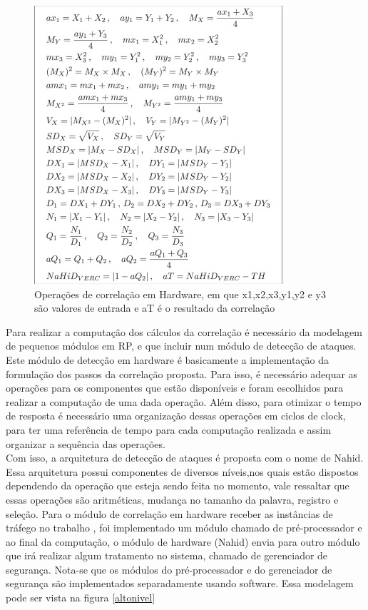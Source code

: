 \documentclass[conference]{IEEEtran}
\begin{document}
	\begin{figure}[htbp]
		\centerline{\includegraphics[scale=1.0]{op2.jpg}}
		\caption{Operações de correlação em Hardware, em que x1,x2,x3,y1,y2 e y3 são valores de entrada e aT é o resultado da correlação}
		\label{ophw}
	\end{figure}
	
    Para realizar a computação dos cálculos da correlação é necessário da modelagem de pequenos módulos em RP, e que incluir num módulo de detecção de ataques. Este módulo de detecção em hardware é basicamente a implementação da formulação dos passos da correlação proposta. Para isso, é necessário adequar as operações para os componentes que estão disponíveis e foram escolhidos para realizar a computação de uma dada operação. Além disso, para otimizar o tempo de resposta é necessário uma organização dessas operações em ciclos de clock, para ter uma referência de tempo para cada computação realizada e assim organizar a sequência das operações.\\
	
	Com isso, a arquitetura de detecção de ataques é proposta com o nome de Nahid. Essa arquitetura possui componentes de diversos níveis,nos quais estão dispostos dependendo da operação que esteja sendo feita no momento, vale ressaltar que essas operações são aritméticas, mudança no tamanho da palavra, registro e seleção. Para o módulo de correlação em hardware receber as instâncias de tráfego no trabalho \cite{b2}, foi implementado um módulo chamado de pré-processador e ao final da computação, o módulo de hardware (Nahid) envia para outro módulo que irá realizar algum tratamento no sistema, chamado de gerenciador de segurança. Nota-se que os módulos do pré-processador e do gerenciador de segurança são
	implementados separadamente usando software. Essa modelagem pode ser vista na figura \ref{altonivel} 
\end{document}
